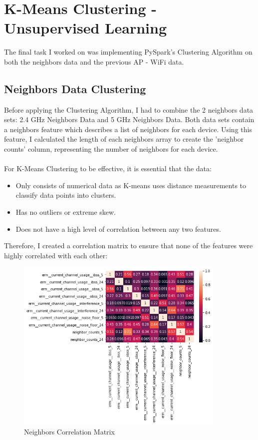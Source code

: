 \documentclass{article}
\begin{document}
\section{K-Means Clustering - Unsupervised Learning}

The final task I worked on was implementing PySpark's Clustering Algorithm on both the neighbors data and the previous AP - WiFi data.

\subsection{Neighbors Data Clustering}

Before applying the Clustering Algorithm, I had to combine the 2 neighbors data sets: 2.4 GHz Neighbors Data and 5 GHz Neighbors Data. Both data sets contain a neighbors feature which describes a list of neighbors for each device. Using this feature, I calculated the length of each neighbors array to create the 'neighbor counts' column, representing the number of neighbors for each device.   
\\ \\
For K-Means Clustering to be effective, it is essential that the data:
\begin{itemize}
  \item Only consists of numerical data as K-means uses distance measurements to classify data points into clusters. 
  \item Has no outliers or extreme skew. 
  \item Does not have a high level of correlation between any two features. 
\end{itemize}
Therefore, I created a correlation matrix to ensure that none of the features were highly correlated with each other:

\begin{figure}[htp]
    \centering
    \includegraphics[width=10cm]{visuals/neighbors_correlation.png}
    \caption{Neighbors Correlation Matrix}
\end{figure}
\end{document}
